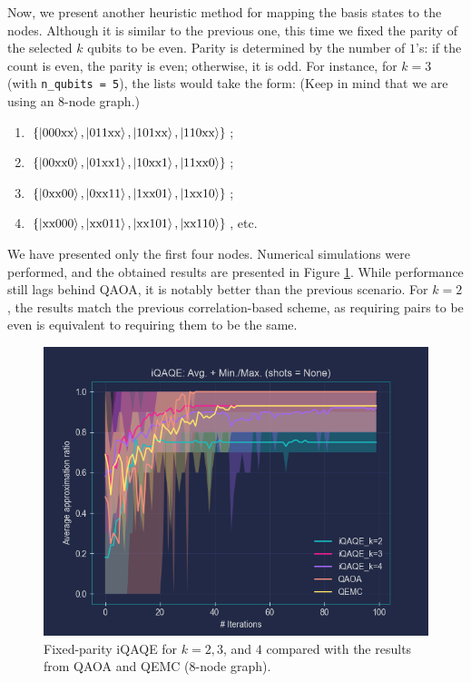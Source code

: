 Now, we present another heuristic method for mapping the basis states to the nodes. Although it is similar to the previous one, this time we fixed the parity of the selected $k$ qubits to be even. Parity is determined by the number of $1$'s: if the count is even, the parity is even; otherwise, it is odd. For instance, for $k=3$ (with \texttt{n\_qubits = 5}), the lists would take the form: (Keep in mind that we are using an $8$-node graph.)
{\normalsize\begin{enumerate}[itemsep=0mm]
    \item $\left\{\ket{000\text{xx}}, \ket{011\text{xx}}, \ket{101\text{xx}}, \ket{110\text{xx}}\right\}$;
    \item $\left\{\ket{00\text{xx}0}, \ket{01\text{xx}1}, \ket{10\text{xx}1}, \ket{11\text{xx}0}\right\}$;
    \item $\left\{\ket{0\text{xx}00}, \ket{0\text{xx}11}, \ket{1\text{xx}01}, \ket{1\text{xx}10}\right\}$;
    \item $\left\{\ket{\text{xx}000}, \ket{\text{xx}011}, \ket{\text{xx}101}, \ket{\text{xx}110}\right\}$, etc.
\end{enumerate}} %
\noindent We have presented only the first four nodes. Numerical simulations were performed, and the obtained results are presented in Figure \ref{fig:Fixed-parity/k=2,3,4}. While performance still lags behind QAOA, it is notably better than the previous scenario. For $k=2$, the results match the previous correlation-based scheme, as requiring pairs to be even is equivalent to requiring them to be the same.
\begin{figure}[H]
    \centering
    \includegraphics[width=0.95\columnwidth]{Figures/Fixed-parity/k=2_3_4(8-node).png}
    \caption{Fixed-parity iQAQE for $k=2, 3$, and $4$ compared with the results from QAOA and QEMC ($8$-node graph).}
    \label{fig:Fixed-parity/k=2,3,4}
\end{figure}

